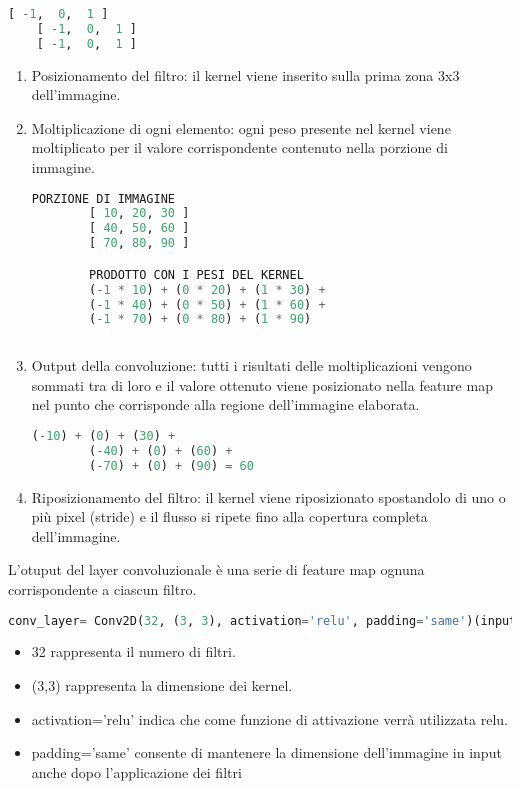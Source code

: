 \begin{lstlisting}[language=Python, frame=none]
    [ -1,  0,  1 ]
    [ -1,  0,  1 ]
    [ -1,  0,  1 ]
\end{lstlisting}


\begin{enumerate}
    \item Posizionamento del filtro: il kernel viene inserito sulla prima zona 3x3 dell'immagine.
    \item Moltiplicazione di ogni elemento: ogni peso presente nel kernel viene moltiplicato per il valore corrispondente contenuto nella porzione di immagine.
        
    \begin{lstlisting}[language=Python, frame=none]
        PORZIONE DI IMMAGINE
        [ 10, 20, 30 ]
        [ 40, 50, 60 ]
        [ 70, 80, 90 ]

        PRODOTTO CON I PESI DEL KERNEL
        (-1 * 10) + (0 * 20) + (1 * 30) +
        (-1 * 40) + (0 * 50) + (1 * 60) +
        (-1 * 70) + (0 * 80) + (1 * 90)
            
    \end{lstlisting}
    \item Output della convoluzione: tutti i risultati delle moltiplicazioni vengono sommati tra di loro e il valore ottenuto viene posizionato nella feature map nel punto che corrisponde alla regione dell'immagine elaborata.
    \begin{lstlisting}[language=Python, frame=none]
        (-10) + (0) + (30) +
        (-40) + (0) + (60) +
        (-70) + (0) + (90) = 60
    \end{lstlisting}
    \item Riposizionamento del filtro: il kernel viene riposizionato spostandolo di uno o più pixel (stride) e il flusso si ripete fino alla copertura completa dell'immagine.
\end{enumerate}

L'otuput del layer convoluzionale è una serie di feature map ognuna corrispondente a ciascun filtro.

\begin{lstlisting}[language=Python, frame=none]
    conv_layer= Conv2D(32, (3, 3), activation='relu', padding='same')(input_img)
\end{lstlisting}

\begin{itemize}
    \item 32 rappresenta il numero di filtri.
    \item (3,3) rappresenta la dimensione dei kernel.
    \item activation='relu' indica che come funzione di attivazione verrà utilizzata relu.
    \item padding='same' consente di mantenere la dimensione dell'immagine in input anche dopo l'applicazione dei filtri
\end{itemize}


